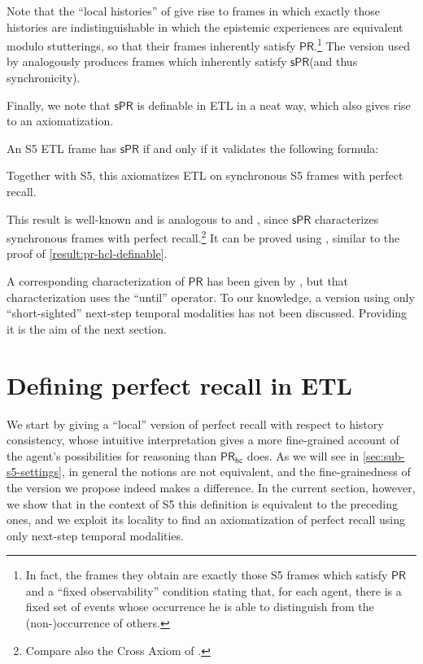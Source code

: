 \documentclass{article}
\newcommand{\PR}{\ensuremath{\mathsf{PR}}\xspace}
\newcommand{\PRs}{\ensuremath{\mathsf{sPR}}\xspace}
\newcommand{\PRhc}{\ensuremath{\mathsf{PR_{hc}}}\xspace}
\newcommand{\tiff}{if and only if\xspace}
\newcounter{#1}
\begin{document}
Note that the ``local histories'' of \citet{parikh_knowledge_2003}
give rise to frames in which exactly those histories are indistinguishable
in which the epistemic experiences are equivalent modulo stutterings,
so that their frames inherently satisfy \PR.\footnote{In fact, the frames they obtain are exactly those S5 frames
  which satisfy \PR and a ``fixed observability'' condition
  stating that, for each agent, there is a fixed set of events
  whose occurrence he is able to distinguish from the (non-)occurrence of others.}
The version used by \citet{pacuit_logic_2006} analogously produces frames
which inherently satisfy \PRs (and thus synchronicity).

\medskip

Finally, we note that \PRs is definable in ETL in a neat way, which also gives rise to an axiomatization.

\begin{proposition}
\label{result:pr-s-definable}
  An S5 ETL frame has \PRs \tiff it validates the following formula:
  
  Together with S5, this axiomatizes ETL on synchronous S5 frames with perfect recall.
\end{proposition}
This result is well-known and is analogous to
\cite[Theorem~4]{van_der_meyden_complete_2003} and \cite[Theorem~3.6]{halpern_complete_2004},
since \PRs characterizes synchronous frames with perfect recall.\footnote{Compare also the Cross Axiom of \citet{dabrowski_topological_1996}.}
It can be proved using \citet{sahlqvist_completeness_1975},
similar to the proof of \cref{result:pr-hcl-definable}.

\medskip

A corresponding characterization of \PR has been given by \citet{van_der_meyden_axioms_1993},
but that characterization uses the ``until'' operator.
To our knowledge, a version using only ``short-sighted'' next-step temporal modalities
has not been discussed.
Providing it is the aim of the next section.

\section{Defining perfect recall in ETL}
\label{sec:char-pras-etl}

We start by giving a ``local'' version of perfect recall with respect to history consistency,
whose intuitive interpretation gives a more fine-grained account of the agent's possibilities for reasoning
than \PRhc does.
As we will see in \cref{sec:sub-s5-settings}, in general the notions are not equivalent,
and the fine-grainedness of the version we propose indeed makes a difference.
In the current section, however, we show that in the context of S5
this definition is equivalent to the preceding ones,
and we exploit its locality to find an axiomatization of perfect recall
using only next-step temporal modalities.
\end{document}
